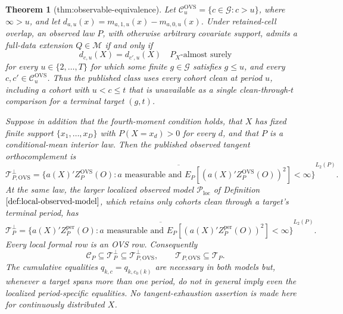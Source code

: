 \documentclass{article}
\newtheorem{theorem}{Theorem}
\begin{document}
\begin{theorem}[thm:observable-equivalence]\label{thm:observable-equivalence}
Let \(\mathcal C_u^{\mathrm{OVS}}=\{c\in\mathcal G:c>u\}\), where \(\infty>u\), and let \(d_{a,u}(x)=m_{a,1,u}(x)-m_{a,0,u}(x)\).  Under retained-cell overlap, an observed law \(P\), with otherwise arbitrary covariate support, admits a full-data extension \(Q\in\mathcal M\) if and only if
\[
d_{c,u}(X)=d_{c',u}(X)
\quad P_X\text{-almost surely}
\tag{1}
\]
for every \(u\in\{2,\ldots,T\}\) for which some finite \(g\in\mathcal G\) satisfies \(g\le u\), and every \(c,c'\in\mathcal C_u^{\mathrm{OVS}}\).  Thus the published class uses every cohort clean at period \(u\), including a cohort with \(u<c\le t\) that is unavailable as a single clean-through-\(t\) comparison for a terminal target \((g,t)\).

Suppose in addition that the fourth-moment condition holds, that \(X\) has fixed finite support \(\{x_1,\ldots,x_D\}\) with \(P(X=x_d)>0\) for every \(d\), and that \(P\) is a conditional-mean interior law.  Then the published observed tangent orthocomplement is
\[
\mathcal T_{P,\mathrm{OVS}}^\perp
=\overline{\{a(X)'Z_P^{\mathrm{OVS}}(O):a\text{ measurable and }
E_P[(a(X)'Z_P^{\mathrm{OVS}}(O))^2]<\infty\}}^{L_2(P)}.
\tag{2}
\]
At the same law, the larger localized observed model \(\mathcal P_{\mathrm{loc}}\) of Definition \(\ref{def:local-observed-model}\), which retains only cohorts clean through a target's terminal period, has
\[
\mathcal T_P^\perp
=\overline{\{a(X)'Z_P^{\mathrm{per}}(O):a\text{ measurable and }
E_P[(a(X)'Z_P^{\mathrm{per}}(O))^2]<\infty\}}^{L_2(P)}.
\tag{3}
\]
Every local formal row is an OVS row.  Consequently
\[
\mathcal C_P\subseteq\mathcal T_P^\perp
\subseteq\mathcal T_{P,\mathrm{OVS}}^\perp,
\qquad
\mathcal T_{P,\mathrm{OVS}}\subseteq\mathcal T_P.
\tag{4}
\]
The cumulative equalities \(q_{k,c}=q_{k,c_0(k)}\) are necessary in both models but, whenever a target spans more than one period, do not in general imply even the localized period-specific equalities.  No tangent-exhaustion assertion is made here for continuously distributed \(X\).
\end{theorem}
\end{document}
